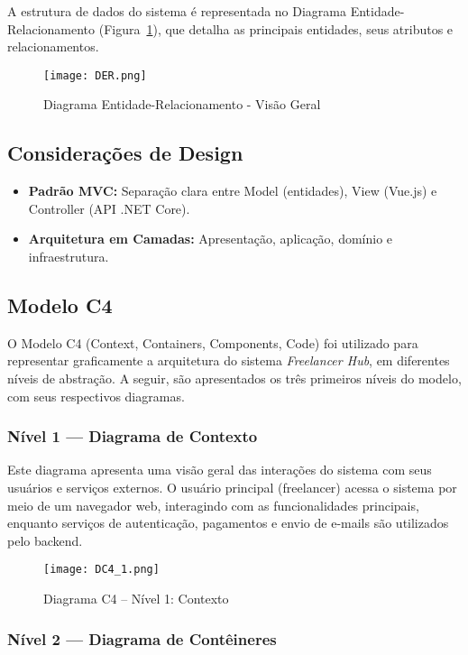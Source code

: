 \documentclass[a4paper,12pt]{article}
\begin{document}
A estrutura de dados do sistema é representada no Diagrama Entidade-Relacionamento (Figura~\ref{fig:der}), que detalha as principais entidades, seus atributos e relacionamentos.

\begin{figure}[H]
  \centering
  \texttt{[image: DER.png]}
  \caption{Diagrama Entidade-Relacionamento - Visão Geral}
  \label{fig:der}
\end{figure}

\subsection{Considerações de Design}
\begin{itemize}[nosep]
  \item \textbf{Padrão MVC:} Separação clara entre Model (entidades), View (Vue.js) e Controller (API .NET Core).
  \item \textbf{Arquitetura em Camadas:} Apresentação, aplicação, domínio e infraestrutura.
\end{itemize}

\subsection{Modelo C4}

O Modelo C4 (Context, Containers, Components, Code) foi utilizado para representar graficamente a arquitetura do sistema \textit{Freelancer Hub}, em diferentes níveis de abstração. A seguir, são apresentados os três primeiros níveis do modelo, com seus respectivos diagramas.

\subsubsection*{Nível 1 — Diagrama de Contexto}

Este diagrama apresenta uma visão geral das interações do sistema com seus usuários e serviços externos. O usuário principal (freelancer) acessa o sistema por meio de um navegador web, interagindo com as funcionalidades principais, enquanto serviços de autenticação, pagamentos e envio de e-mails são utilizados pelo backend.

\begin{figure}[H]
  \centering
  \texttt{[image: DC4\_1.png]}
  \caption{Diagrama C4 – Nível 1: Contexto}
  \label{fig:c4-contexto}
\end{figure}

\subsubsection*{Nível 2 — Diagrama de Contêineres}
\end{document}
